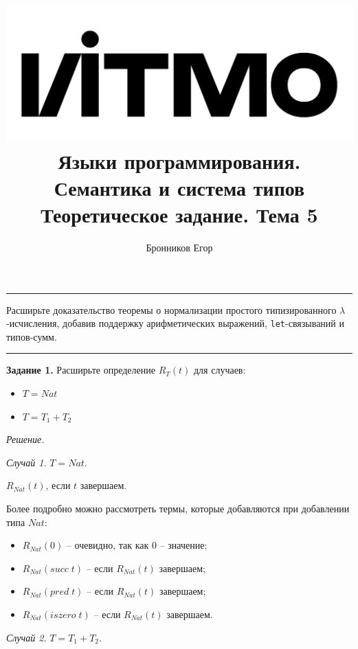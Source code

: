 \documentclass[landscape, 11pt]{report}
\title{
	\includegraphics[scale=0.07]{logo}\\
	\vspace{0.5em}
	Языки программирования. Семантика и система типов\\
	\vspace{0.2em}
	\Large Теоретическое задание. Тема 5
}
\author{Бронников Егор}
\date{}
\begin{document}
	
	
	\maketitle
	
	
	\vspace{-0.5cm}
	\hrule
	\vspace{0.5cm}
	
	Расширьте доказательство теоремы о нормализации простого типизированного $\lambda$-исчисления, добавив поддержку арифметических выражений, \verb|let|-связываний и типов-сумм.
	
	\vspace{0.5cm}
	\hrule
	\vspace{0.5cm}
	
	
	\textbf{Задание 1.} Расширьте определение $R_T(t)$ для случаев:
	
	\begin{itemize}
		\item $T = Nat$
		\item $T = T_1 + T_2$
	\end{itemize}
	
	\textit{Решение.}
	
	\vspace{0.2cm}
	
	\textit{Случай 1.} $T = Nat$.
	
	\vspace{0.2cm}
	
	$R_{Nat}(t)$, если $t$ завершаем.

	Более подробно можно рассмотреть термы, которые добавляются при добавлении типа $Nat$:
	
	\vspace{-0.2cm}
	
	\begin{itemize}
		\item $R_{Nat}(0)$ -- очевидно, так как 0 -- значение;
		\item $R_{Nat}(succ \; t)$ -- если $R_{Nat}(t)$ завершаем;
		\item $R_{Nat}(pred \; t)$ -- если $R_{Nat}(t)$ завершаем;
		\item $R_{Nat}(iszero \; t)$ -- если $R_{Nat}(t)$ завершаем.
	\end{itemize}

	\vspace{0.2cm}

	\textit{Случай 2.} $T = T_1 + T_2$.
	
\end{document}
